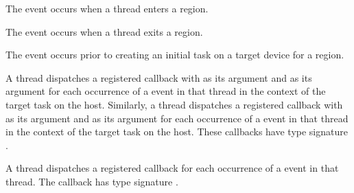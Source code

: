 \events
The  event occurs when a thread enters a  region.

The  event occurs when a thread exits a  region.

The  event occurs prior to creating an initial task on 
a target device for a  region.

\tools
{}
A thread dispatches a registered  callback with 
 as its  argument and  as 
its  argument for each occurrence of a  event in that 
thread in the context of the target task on the host. Similarly, a thread dispatches 
a registered  callback with  as its 
 argument and  as its  argument for each 
occurrence of a  event in that thread in the context of the target 
task on the host. These callbacks have type signature . 

A thread dispatches a registered  callback for 
each occurrence of a  event in that thread. The callback has 
type signature .

